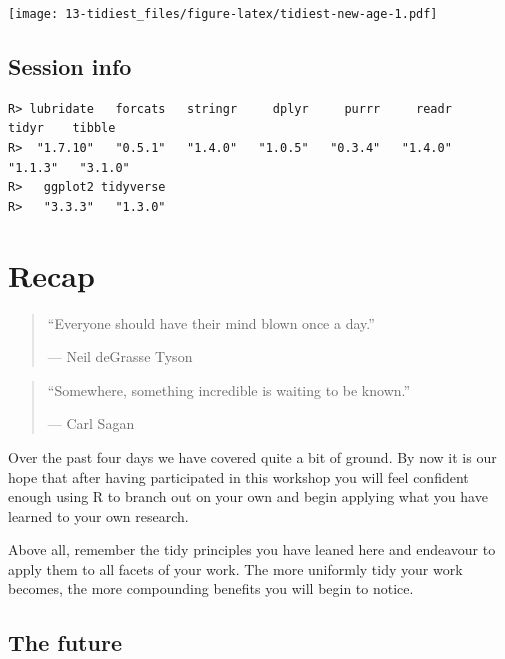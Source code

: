 \documentclass[
]{book}
\newenvironment{Shaded}{\begin{snugshade}}{\end{snugshade}}
\newcommand{\FunctionTok}[1]{\textcolor[rgb]{0.00,0.00,0.00}{#1}}
\newcommand{\NormalTok}[1]{#1}
\newcommand{\SpecialCharTok}[1]{\textcolor[rgb]{0.00,0.00,0.00}{#1}}
\newcommand{\StringTok}[1]{\textcolor[rgb]{0.31,0.60,0.02}{#1}}
\begin{document}
\texttt{[image: 13-tidiest\_files/figure-latex/tidiest-new-age-1.pdf]}

\hypertarget{session-info-10}{%
\section{Session info}\label{session-info-10}}

\begin{Shaded}
\end{Shaded}

\begin{verbatim}
R> lubridate   forcats   stringr     dplyr     purrr     readr     tidyr    tibble 
R>  "1.7.10"   "0.5.1"   "1.4.0"   "1.0.5"   "0.3.4"   "1.4.0"   "1.1.3"   "3.1.0" 
R>   ggplot2 tidyverse 
R>   "3.3.3"   "1.3.0"
\end{verbatim}

\hypertarget{recap}{%
\chapter{Recap}\label{recap}}

\begin{quote}
``Everyone should have their mind blown once a day.''

--- Neil deGrasse Tyson
\end{quote}

\begin{quote}
``Somewhere, something incredible is waiting to be known.''

--- Carl Sagan
\end{quote}

Over the past four days we have covered quite a bit of ground. By now it is our hope that after having participated in this workshop you will feel confident enough using R to branch out on your own and begin applying what you have learned to your own research.

Above all, remember the tidy principles you have leaned here and endeavour to apply them to all facets of your work. The more uniformly tidy your work becomes, the more compounding benefits you will begin to notice.

\hypertarget{the-future}{%
\section{The future}\label{the-future}}
\end{document}
